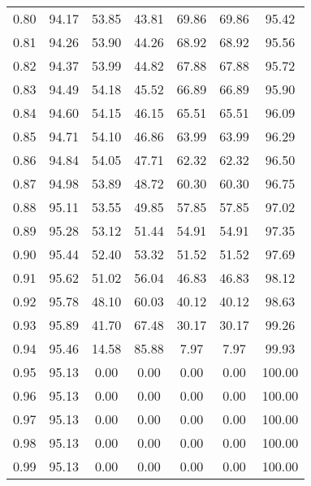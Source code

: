 \begin{tabular}{|c|c|c|c|c|c|c|}
      0.80 &     94.17 &     53.85 &      43.81 &   69.86 &      69.86 &         95.42 \\
      0.81 &     94.26 &     53.90 &      44.26 &   68.92 &      68.92 &         95.56 \\
      0.82 &     94.37 &     53.99 &      44.82 &   67.88 &      67.88 &         95.72 \\
      0.83 &     94.49 &     54.18 &      45.52 &   66.89 &      66.89 &         95.90 \\
      0.84 &     94.60 &     54.15 &      46.15 &   65.51 &      65.51 &         96.09 \\
      0.85 &     94.71 &     54.10 &      46.86 &   63.99 &      63.99 &         96.29 \\
      0.86 &     94.84 &     54.05 &      47.71 &   62.32 &      62.32 &         96.50 \\
      0.87 &     94.98 &     53.89 &      48.72 &   60.30 &      60.30 &         96.75 \\
      0.88 &     95.11 &     53.55 &      49.85 &   57.85 &      57.85 &         97.02 \\
      0.89 &     95.28 &     53.12 &      51.44 &   54.91 &      54.91 &         97.35 \\
      0.90 &     95.44 &     52.40 &      53.32 &   51.52 &      51.52 &         97.69 \\
      0.91 &     95.62 &     51.02 &      56.04 &   46.83 &      46.83 &         98.12 \\
      0.92 &     95.78 &     48.10 &      60.03 &   40.12 &      40.12 &         98.63 \\
      0.93 &     95.89 &     41.70 &      67.48 &   30.17 &      30.17 &         99.26 \\
      0.94 &     95.46 &     14.58 &      85.88 &    7.97 &       7.97 &         99.93 \\
      0.95 &     95.13 &      0.00 &       0.00 &    0.00 &       0.00 &        100.00 \\
      0.96 &     95.13 &      0.00 &       0.00 &    0.00 &       0.00 &        100.00 \\
      0.97 &     95.13 &      0.00 &       0.00 &    0.00 &       0.00 &        100.00 \\
      0.98 &     95.13 &      0.00 &       0.00 &    0.00 &       0.00 &        100.00 \\
      0.99 &     95.13 &      0.00 &       0.00 &    0.00 &       0.00 &        100.00 \\
\bottomrule
\end{tabular}
